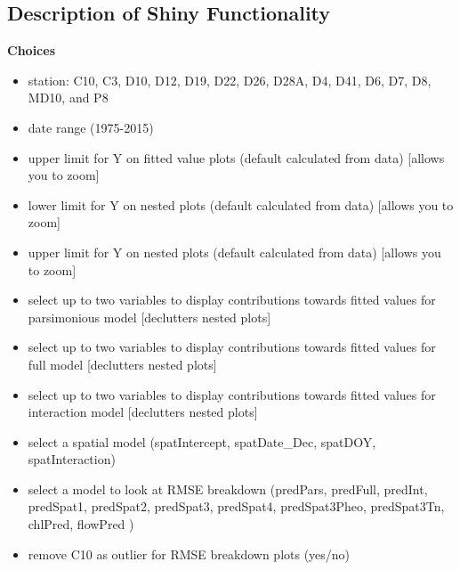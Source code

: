 \documentclass[12pt]{amsart}
\begin{document}
\subsection{Description of Shiny Functionality}

\textbf{Choices}
\begin{itemize}
\item station: C10, C3, D10, D12, D19, D22, D26, D28A, D4, D41, D6, D7, D8, MD10, and P8
\item date range (1975-2015)
\item upper limit for Y on fitted value plots (default calculated from data) [allows you to zoom]
\item lower limit for Y on nested plots (default calculated from data) [allows you to zoom]

\item upper limit for Y on nested plots (default calculated from data) [allows you to zoom]

\item select up to two variables to display contributions towards fitted values for parsimonious model [declutters nested plots]
\item select up to two variables to display contributions towards fitted values for full model [declutters nested plots]
\item select up to two variables to display contributions towards fitted values for interaction model [declutters nested plots]
\item select a spatial model (spatIntercept, spatDate_Dec, spatDOY, spatInteraction)
\item select a model to look at RMSE breakdown (predPars, predFull, predInt, predSpat1, predSpat2, predSpat3, predSpat4, predSpat3Pheo, predSpat3Tn, chlPred, flowPred )
\item remove C10 as outlier for RMSE breakdown plots (yes/no)
\end{itemize}
\end{document}
